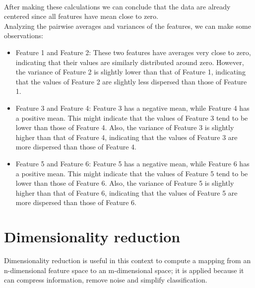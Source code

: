 \documentclass{article}
\begin{document}
    \\
After making these calculations we can conclude that the data are already centered since all features have mean close to zero.\\
Analyzing the pairwise averages and variances of the features, we can make some observations:  
\begin{itemize}
    \item Feature 1 and Feature 2: These two features have averages very close to zero, indicating that their values are similarly distributed around zero. However, the variance of Feature 2 is slightly lower than that of Feature 1, indicating that the values of Feature 2 are slightly less dispersed than those of Feature 1.  
    \item Feature 3 and Feature 4: Feature 3 has a negative mean, while Feature 4 has a positive mean. This might indicate that the values of Feature 3 tend to be lower than those of Feature 4. Also, the variance of Feature 3 is slightly higher than that of Feature 4, indicating that the values of Feature 3 are more dispersed than those of Feature 4.  
    \item Feature 5 and Feature 6: Feature 5 has a negative mean, while Feature 6 has a positive mean. This might indicate that the values of Feature 5 tend to be lower than those of Feature 6. Also, the variance of Feature 5 is slightly higher than that of Feature 6, indicating that the values of Feature 5 are more dispersed than those of Feature 6. 
\end{itemize}

\section{Dimensionality reduction}
Dimensionality reduction is useful in this context to compute a mapping from an n-dimensional feature space to an m-dimensional space; it is applied because it can compress information, remove noise and simplify classification.
\end{document}
